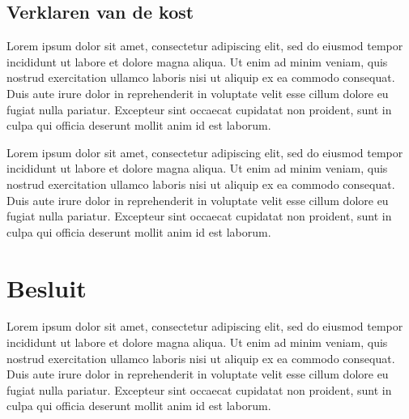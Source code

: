 \documentclass[a4paper]{kulakarticle}
\begin{document}
	\subsection{Verklaren van de kost}
	
	Lorem ipsum dolor sit amet, consectetur adipiscing elit, sed do eiusmod tempor incididunt ut labore et dolore magna aliqua. Ut enim ad minim veniam, quis nostrud exercitation ullamco laboris nisi ut aliquip ex ea commodo consequat. Duis aute irure dolor in reprehenderit in voluptate velit esse cillum dolore eu fugiat nulla pariatur. Excepteur sint occaecat cupidatat non proident, sunt in culpa qui officia deserunt mollit anim id est laborum.
	
	Lorem ipsum dolor sit amet, consectetur adipiscing elit, sed do eiusmod tempor incididunt ut labore et dolore magna aliqua. Ut enim ad minim veniam, quis nostrud exercitation ullamco laboris nisi ut aliquip ex ea commodo consequat. Duis aute irure dolor in reprehenderit in voluptate velit esse cillum dolore eu fugiat nulla pariatur. Excepteur sint occaecat cupidatat non proident, sunt in culpa qui officia deserunt mollit anim id est laborum.
	
	\section*{Besluit}
	Lorem ipsum dolor sit amet, consectetur adipiscing elit, sed do eiusmod tempor incididunt ut labore et dolore magna aliqua. Ut enim ad minim veniam, quis nostrud exercitation ullamco laboris nisi ut aliquip ex ea commodo consequat. Duis aute irure dolor in reprehenderit in voluptate velit esse cillum dolore eu fugiat nulla pariatur. Excepteur sint occaecat cupidatat non proident, sunt in culpa qui officia deserunt mollit anim id est laborum.
	
\end{document}

